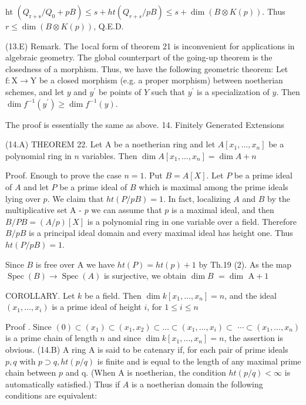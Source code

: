 ht $\left(Q_{\mathrm{r}+\mathrm{s}} / Q_{0}+p B\right) \leqslant s+h t\left(Q_{r+s} / p B\right) \leqslant s+\operatorname{dim}(B \otimes K(p))$. Thus $r \leqslant \operatorname{dim}(B \otimes K(p))$, Q.E.D.

(13.E) Remark. The 1ocal form of theorem 21 is inconvenient for applications in algebraic geometry. The global counterpart of the going-up theorem is the closedness of a morphism. Thus, we have the following geometric theorem: Let $\mathrm{f}: \mathrm{X} \rightarrow \mathrm{Y}$ be a closed morphism (e.g. a proper morphism) between noetherian schemes, and let $y$ and $y^{\prime}$ be points of $Y$ such that $y^{\prime}$ is a specialization of $y$. Then $\operatorname{dim} f^{-1}\left(y^{\prime}\right) \geqslant \operatorname{dim} f^{-1}(y)$.

The proof is essentially the same as above. 14. Finitely Generated Extensions

(14.A) THEOREM 22. Let A be a noetherian ring and let $A\left[x_{1}, \ldots, x_{n}\right]$ be a polynomial ring in $n$ variables. Then $\operatorname{dim} A\left[x_{1}, \ldots, x_{n}\right]=\operatorname{dim} A+n$

Proof. Enough to prove the case $n=1$. Put $B=A[X]$. Let $P$ be a prime ideal of $A$ and let $P$ be a prime ideal of $B$ which is maximal among the prime ideals lying over $p$. We claim that $h t(P / p B)=1$. In fact, localizing $A$ and $B$ by the multiplicative set A - $p$ we can assume that $p$ is a maximal ideal, and then $B / P B=(A / p)[X]$ is a polynomial ring in one variable over a field. Therefore $B / p B$ is a principal ideal domain and every maximal ideal has height one. Thus $h t(P / p B)=1$.

Since $B$ is free over A we have $h t(P)=h t(p)+1$ by Th.19 (2). As the map $\operatorname{Spec}(B) \rightarrow \operatorname{Spec}(A)$ is surjective, we obtain $\operatorname{dim} B$ $=\operatorname{dim~} \mathrm{A}+1$

COROLLARY. Let $k$ be a field. Then $\operatorname{dim} k\left[x_{1}, \ldots, x_{n}\right]=n$, and the ideal $\left(x_{1}, \ldots, x_{i}\right)$ is a prime ideal of height $i$, for $1 \leqslant i \leqslant n$

Proof $.$ Since $(0) \subset\left(x_{1}\right) \subset\left(x_{1}, x_{2}\right) \subset \ldots \subset\left(x_{1}, \ldots, x_{i}\right) \subset$ $\cdots \subset\left(x_{1}, \ldots, x_{n}\right)$ is a prime chain of length $n$ and since $\operatorname{dim} k\left[x_{1}, \ldots, x_{n}\right]=n$, the assertion is obvious. (14.B) A ring A is said to be catenary if, for each pair of prime ideals $p, q$ with $p \supset q, h t(p / q)$ is finite and is equal to the length of any maximal prime chain between $p$ and q. (When A is noetherian, the condition $h t(p / q)<\infty$ is automatically satisfied.) Thus if $A$ is a noetherian domain the following conditions are equivalent:

